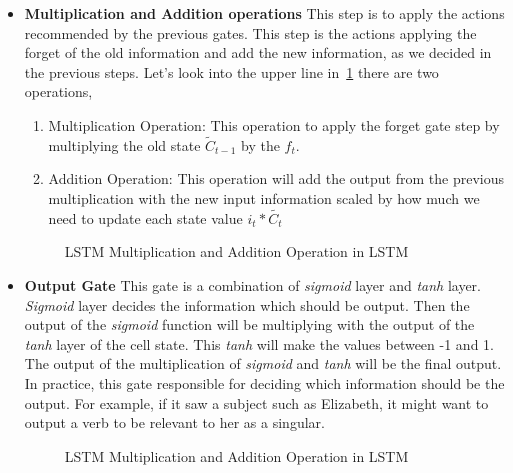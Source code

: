 \begin{itemize}
\item \textbf{Multiplication and Addition operations} This step is to apply the actions recommended by the previous gates. This step is the actions applying the forget of the old information and add the new information, as we decided in the previous steps. Let's look into the upper line in~\ref{fig:LSTM-pointwise-operations} there are two operations, 
  \begin{enumerate}
  \item Multiplication Operation: This operation to apply the forget gate step by multiplying the old state $\tilde{C}_{t-1} $ by the $f_t$.
  \item Addition Operation: This operation will add the output from the previous multiplication with the new input information scaled by how much we need to update each state value $i_t * \tilde{C_t}$
    \end{enumerate}



    \begin{figure}[ht!]
      \centering
      
        \caption{LSTM Multiplication and Addition Operation in LSTM~\cite{colah}}
        \label{fig:LSTM-pointwise-operations}
      \end{figure}
      
      
    \item \textbf{Output Gate} This gate is a combination of \textit{sigmoid} layer and \textit{tanh} layer. \textit{Sigmoid} layer decides the information which should be output. Then the output of the  \textit{sigmoid} function will be multiplying with the output of the \textit{tanh} layer of the cell state. This \textit{tanh} will make the values between -1 and 1. The output of the multiplication of \textit{sigmoid} and \textit{tanh} will be the final output. In practice, this gate responsible for deciding which information should be the output. For example, if it saw a subject such as Elizabeth, it might want to output a verb to be relevant to her as a singular.


      
\begin{figure}[ht!]
  \centering
  
        \caption{LSTM Multiplication and Addition Operation in LSTM~\cite{colah}}\label{fig:LSTM-output-gate}
      \end{figure}
      
    \end{itemize}

